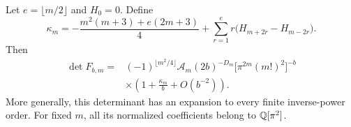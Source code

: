 \begin{theorem}\label{gb:harmonic-correction}
Let $e=\lfloor m/2\rfloor$ and $H_0=0$.  Define
\begin{equation}\label{gb:kappa}
 \boxed{\displaystyle
 \kappa_m=-\frac{m^2(m+3)+e(2m+3)}4
       +\sum_{r=1}^{e}r\bigl(H_{m+2r}-H_{m-2r}\bigr).}
\end{equation}
Then
\begin{equation}\label{gb:det-first-correction}
\begin{split}
 \det F_{b,m}={}&(-1)^{\lfloor m^2/4\rfloor}\mathcal A_m
       (2b)^{-D_m}\bigl[\pi^{2m}(m!)^2\bigr]^{-b}\\
 &\times\left(1+\frac{\kappa_m}{b}+O(b^{-2})\right).
\end{split}
\end{equation}
More generally, this determinant has an expansion to every finite
inverse-power order.  For fixed $m$, all its normalized coefficients
belong to $\mathbb Q[\pi^2]$.
\end{theorem}

